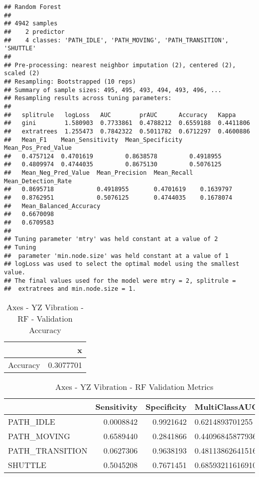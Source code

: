 \documentclass[]{article}
\begin{document}
\begin{verbatim}
## Random Forest 
## 
## 4942 samples
##    2 predictor
##    4 classes: 'PATH_IDLE', 'PATH_MOVING', 'PATH_TRANSITION', 'SHUTTLE' 
## 
## Pre-processing: nearest neighbor imputation (2), centered (2), scaled (2) 
## Resampling: Bootstrapped (10 reps) 
## Summary of sample sizes: 495, 495, 493, 494, 493, 496, ... 
## Resampling results across tuning parameters:
## 
##   splitrule   logLoss   AUC        prAUC      Accuracy   Kappa    
##   gini        1.580903  0.7733861  0.4788212  0.6559188  0.4411806
##   extratrees  1.255473  0.7842322  0.5011782  0.6712297  0.4600886
##   Mean_F1    Mean_Sensitivity  Mean_Specificity  Mean_Pos_Pred_Value
##   0.4757124  0.4701619         0.8638578         0.4918955          
##   0.4809974  0.4744035         0.8675130         0.5076125          
##   Mean_Neg_Pred_Value  Mean_Precision  Mean_Recall  Mean_Detection_Rate
##   0.8695718            0.4918955       0.4701619    0.1639797          
##   0.8762951            0.5076125       0.4744035    0.1678074          
##   Mean_Balanced_Accuracy
##   0.6670098             
##   0.6709583             
## 
## Tuning parameter 'mtry' was held constant at a value of 2
## Tuning
##  parameter 'min.node.size' was held constant at a value of 1
## logLoss was used to select the optimal model using the smallest value.
## The final values used for the model were mtry = 2, splitrule =
##  extratrees and min.node.size = 1.
\end{verbatim}

\begin{table}[!h]

\caption{\label{tab:sensor-yz-vib-rf-results}Axes - YZ Vibration - RF - Validation Accuracy}
\centering
\begin{tabular}[t]{lr}
\toprule
  & x\\
\midrule
Accuracy & 0.3077701\\
\bottomrule
\end{tabular}
\end{table}

\begin{table}[!h]

\caption{\label{tab:sensor-yz-vib-rf-results}Axes - YZ Vibration - RF Validation Metrics}
\centering
\begin{tabular}[t]{lrrl}
\toprule
  & Sensitivity & Specificity & MultiClassAUC\\
\midrule
PATH\_IDLE & 0.0008842 & 0.9921642 & 0.6214893701255\\
PATH\_MOVING & 0.6589440 & 0.2841866 & 0.44096845877936\\
PATH\_TRANSITION & 0.0627306 & 0.9638193 & 0.481138626415166\\
SHUTTLE & 0.5045208 & 0.7671451 & 0.685932116169101\\
\bottomrule
\end{tabular}
\end{table}
\end{document}

